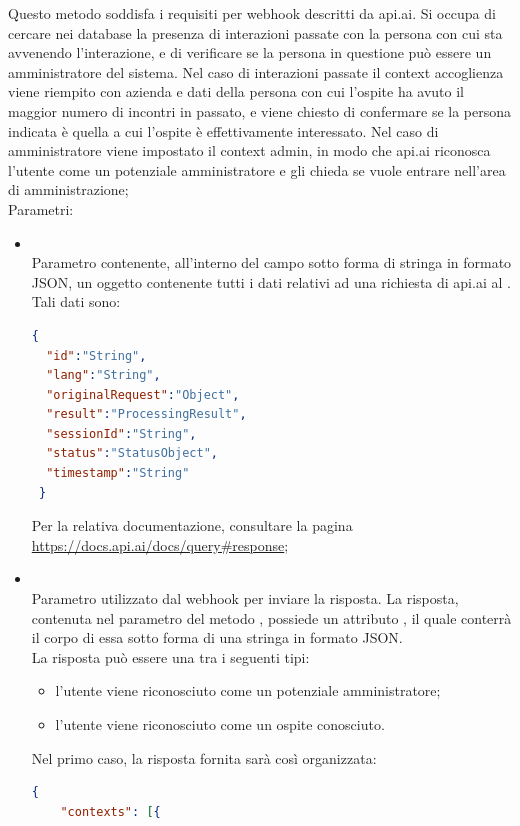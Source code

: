 \begin{itemize}
\begin{itemize}
		Questo metodo soddisfa i requisiti per webhook descritti da api.ai. Si occupa di cercare nei database la presenza di interazioni passate con la persona con cui sta avvenendo l'interazione, e di verificare se la persona in questione può essere un amministratore del sistema. Nel caso di interazioni passate il context accoglienza viene riempito con azienda e dati della persona con cui l'ospite ha avuto il maggior numero di incontri in passato, e viene chiesto di confermare se la persona indicata è quella a cui l'ospite è effettivamente interessato. Nel caso di amministratore viene impostato il context admin, in modo che api.ai riconosca l'utente come un potenziale amministratore e gli chieda se vuole entrare nell'area di amministrazione;\\
		Parametri:
		\begin{itemize}
			\item {} \\
			Parametro contenente, all'interno del campo  sotto forma di stringa in formato JSON, un oggetto contenente tutti i dati relativi ad una richiesta di api.ai al . Tali dati sono:
\begin{lstlisting}[language=json,firstnumber=1]
{
  "id":"String",
  "lang":"String",
  "originalRequest":"Object",
  "result":"ProcessingResult",
  "sessionId":"String",
  "status":"StatusObject",
  "timestamp":"String"
 }
\end{lstlisting}
Per la relativa documentazione, consultare la pagina \url{https://docs.api.ai/docs/query#response};
			\item {} \\
			Parametro utilizzato dal webhook per inviare la risposta. La risposta, contenuta nel  parametro del metodo , possiede un attributo , il quale conterrà il corpo di essa sotto forma di una stringa in formato JSON. \\
La risposta può essere una tra i seguenti tipi:
\begin{itemize}
    \item l'utente viene riconosciuto come un potenziale amministratore;
    \item l'utente viene riconosciuto come un ospite conosciuto.
\end{itemize}
Nel primo caso, la risposta fornita sarà così organizzata:
\begin{lstlisting}[language=json,firstnumber=1]
{
    "contexts": [{

\end{lstlisting}
\end{itemize}
\end{itemize}
\end{itemize}
